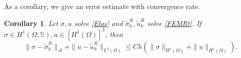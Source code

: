 \documentclass[12pt]{amsart}
\numberwithin{equation}{section}
\newtheorem{corollary}[theorem]{Corollary}
\theoremstyle{definition}
\theoremstyle{remark}
\renewcommand{\(}{\bigl(}
\renewcommand{\)}{\bigr)}
\newcommand{\tsigma}{\tilde{\sigma}}
\newcommand{\tu}{\tilde{u}}
\newcommand{\dive}{{\ensuremath\mathop{\mathrm{div}\,}}} %
\newcommand{\Aa}{\mathcal{A}}
\newcommand{\revj}[1]{{\color{black}#1}}
\begin{document}
%
As a corollary, we give an error estimate with convergence rate. 
\begin{corollary}
Let $\sigma, u$ solve \eqref{Elas}  and $\tsigma^R_h, \tu^R_h$ solve \eqref{FEMRt}. If  $\sigma  \in H^1(\Omega, \mathbb{S}), u \in [H^1(\Omega)]^3$, then
 \begin{equation}
\|\sigma-\tsigma^R_h\|_{\Aa}+ \|u-\tu^R_h\|_{L^2(\Omega)} \le C  h (\|\sigma\|_{H^1(\Omega)} +\|u\|_{H^1(\Omega)}).
\end{equation}
 \end{corollary}

\end{document}
